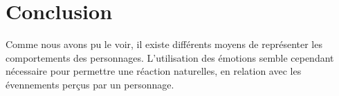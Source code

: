 \documentclass[asi]{picINSA}
\begin{document}
\section{Conclusion}

Comme nous avons pu le voir, il existe différents moyens de représenter les comportements des personnages. L'utilisation des émotions semble cependant nécessaire pour permettre une réaction naturelles, en relation avec les évennements perçus par un personnage.



{}

\end{document}
